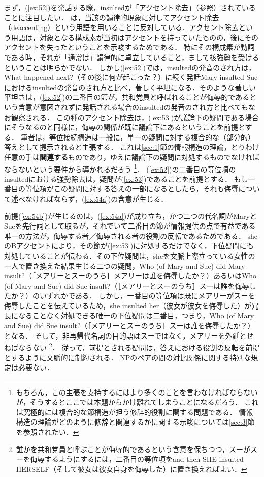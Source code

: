 \documentclass{goken}
\newcommand{\term}[2]{\textsf{#1}（#2）}
\newcommand{\ori}[1]{\noindent\textcolor[gray]{0.7}{\fontsize{8pt}{8pt}\selectfont{\textsf{(p.~#1)}}} }
\begin{document}
まず，(\ref{ex:52})を発話する際，insultedが「アクセント除去」（\citealt{Ladd1980}参照）されていることに注目したい．
\citet{Selkirk1984}は，当該の韻律的現象に対して\term{アクセント除去}{deaccenting}という用語を用いることに反対している．アクセント除去という用語は，対象となる構成素が当初はアクセントを持っていたものの，後にそのアクセントを失ったということを示唆するためである．
特にその構成素が動詞である時，それが「通常は」韻律的に卓立していること，まして核強勢を受けるということは明らかでない．
しかし(\ref{ex:52})では，insultedの発音のされ方は，What happened next?（その後に何が起こった？）に続く発話Mary insulted Sueにおけるinsultedの発音のされ方と比べ，著しく平坦になる．そのような著しい平坦さは，(\ref{ex:52})の二番目の節が，共和党員と呼ばれることが侮辱的であるという含意が意図されずに発話される場合のinsultedの発音のされ方と比べてもなお観察される．
\ori{52}
この種のアクセント除去は，(\ref{ex:53})が議論下の疑問である場合にそうなるのと同様に，侮辱の関係が既に議論下にあるということを前提とする．
筆者は，等位接続構造は一般に，単一の疑問に対する複合的な（部分的）答えとして提示されると主張する．
これは\ref{sec:1}節の情報構造の理論，とりわけ任意の手は\textbf{関連する}ものであり，ゆえに議論下の疑問に対処するものでなければならないという要件から導かれるだろう
\footnote{%
  もちろん，この主張を支持するにはより多くのことを言わなければならないが，そうするとここでは本題からかけ離れてしまうことになるだろう．
  これは究極的には複合的な節構造が担う修辞的役割に関する問題である．
  情報構造の理論がどのように修辞と関連するかに関する示唆については\ref{sec:3}節を参照されたい．
}．
(\ref{ex:52})の二番目の等位項のinsultedにおける強勢除去は，疑問が(\ref{ex:53})であることを前提とする．
もし一番目の等位項がこの疑問に対する答えの一部になるとしたら，それも侮辱について述べなければならず，(\ref{ex:54a})の含意が生じる．

前提(\ref{ex:54b})が生じるのは，(\ref{ex:54a})が成り立ち，かつ二つの代名詞がMaryとSueを先行詞として取るが，それでいて二番目の節が情報提供の点で有益である唯一の方法が，侮辱する者／侮辱される者の役割の反転であるためである．
sheのBアクセントにより，その節が(\ref{ex:53})に対処するだけでなく，下位疑問にも対処していることが伝わる．その下位疑問は，sheを文脈上際立っている女性の一人で置き換えた結果生じる二つの疑問，Who (of Mary and Sue) did Mary insult?（［メアリーとスーのうち］メアリーは誰を侮辱したか？）あるいはWho (of Mary and Sue) did Sue insult?（［メアリーとスーのうち］スーは誰を侮辱したか？）のいずれかである．
しかし，一番目の等位項は既にメアリーがスーを侮辱したことを伝えているため，she insulted her（彼女が彼女を侮辱した）が冗長になることなく対処できる唯一の下位疑問は二番目，つまり，Who (of Mary and Sue) did Sue insult?（［メアリーとスーのうち］スーは誰を侮辱したか？）となる．
そして，非再帰代名詞の目的語はスーではなく，メアリーを外延とせねばならない
\footnote{%
	誰かを共和党員と呼ぶことが侮辱的であるという含意を保ちつつ，スーがスーを侮辱するようにするには，二番目の等位項をand then SHE insulted HERSELF（そして彼女は彼女自身を侮辱した）に置き換えればよい．
}．
従って，前提とされる疑問は，答えにおける役割の反転を前提とするように文脈的に制約される．
NPのペアの間の対比関係に関する特別な規定は必要ない．
\end{document}
